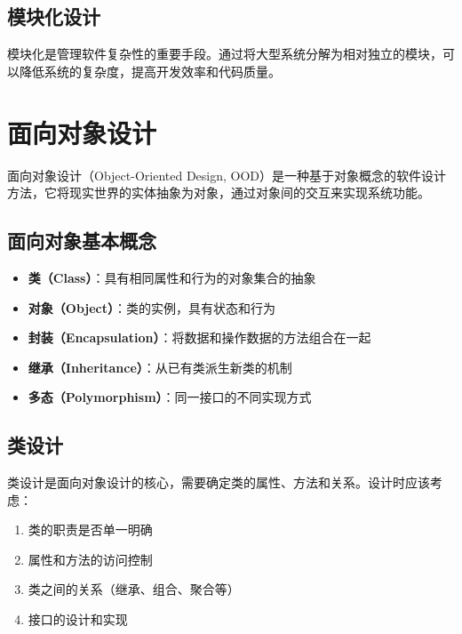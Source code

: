 \subsection{模块化设计}

模块化是管理软件复杂性的重要手段。通过将大型系统分解为相对独立的模块，可以降低系统的复杂度，提高开发效率和代码质量。


\section{面向对象设计}

面向对象设计（Object-Oriented Design, OOD）是一种基于对象概念的软件设计方法，它将现实世界的实体抽象为对象，通过对象间的交互来实现系统功能。

\subsection{面向对象基本概念}

\begin{itemize}
    \item \textbf{类（Class）}：具有相同属性和行为的对象集合的抽象
    \item \textbf{对象（Object）}：类的实例，具有状态和行为
    \item \textbf{封装（Encapsulation）}：将数据和操作数据的方法组合在一起
    \item \textbf{继承（Inheritance）}：从已有类派生新类的机制
    \item \textbf{多态（Polymorphism）}：同一接口的不同实现方式
\end{itemize}

\subsection{类设计}

类设计是面向对象设计的核心，需要确定类的属性、方法和关系。设计时应该考虑：

\begin{enumerate}
    \item 类的职责是否单一明确
    \item 属性和方法的访问控制
    \item 类之间的关系（继承、组合、聚合等）
    \item 接口的设计和实现
\end{enumerate}

